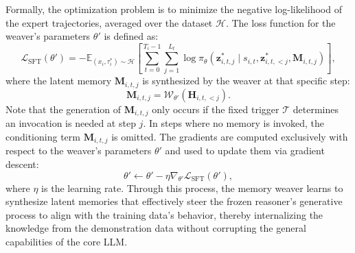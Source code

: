 \documentclass[]{fairmeta}
\begin{document}
Formally, the optimization problem is to minimize the negative log-likelihood of the expert trajectories, averaged over the dataset $\mathcal{H}$. The loss function for the weaver's parameters $\theta'$ is defined as:
\begin{equation}
\mathcal{L}_{\text{SFT}}(\theta') = - \mathbb{E}_{(x_i, \tau_i^*) \sim \mathcal{H}} \left[ \sum_{t=0}^{T_i-1} \sum_{j=1}^{L_t} \log \pi_\theta(\mathbf{z}_{i,t,j}^* \mid s_{i,t}, \mathbf{z}_{i,t,<j}^*, \mathbf{M}_{i,t,j}) \right],
\end{equation}
where the latent memory $\mathbf{M}_{i,t,j}$ is synthesized by the weaver at that specific step:
\begin{equation}
\mathbf{M}_{i,t,j} = \mathcal{W}_{\theta'}(\mathbf{H}_{i,t,<j}).
\end{equation}
Note that the generation of $\mathbf{M}_{i,t,j}$ only occurs if the fixed trigger $\mathcal{T}$ determines an invocation is needed at step $j$. In steps where no memory is invoked, the conditioning term $\mathbf{M}_{i,t,j}$ is omitted.
The gradients are computed exclusively with respect to the weaver's parameters $\theta'$ and used to update them via gradient descent:
\begin{equation}
\theta' \leftarrow \theta' - \eta \nabla_{\theta'} \mathcal{L}_{\text{SFT}}(\theta'),
\end{equation}
where $\eta$ is the learning rate. Through this process, the memory weaver learns to synthesize latent memories that effectively steer the frozen reasoner's generative process to align with the training data's behavior, thereby internalizing the knowledge from the demonstration data without corrupting the general capabilities of the core LLM.
\end{document}
